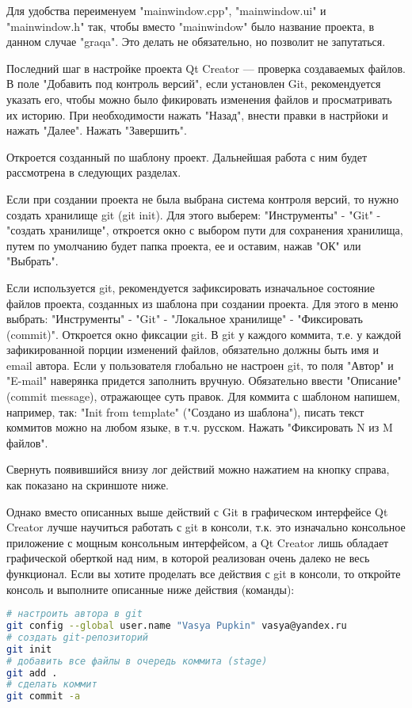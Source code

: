 Для удобства переименуем "mainwindow.cpp", "mainwindow.ui" и "mainwindow.h" так, чтобы вместо "mainwindow" было название проекта, в данном случае "graqa". Это делать не обязательно, но позволит не запутаться.

Последний шаг в настройке проекта Qt Creator — проверка создаваемых файлов. В поле "Добавить под контроль версий", если установлен Git, рекомендуется указать его, чтобы можно было фикировать изменения файлов и просматривать их историю. При необходимости нажать "Назад", внести правки в настрйоки и нажать "Далее". Нажать "Завершить".

Откроется созданный по шаблону проект. Дальнейшая работа с ним будет рассмотрена в следующих разделах.

Если при создании проекта не была выбрана система контроля версий, то нужно создать хранилище git (git init). Для этого выберем: "Инструменты" - "Git" - "создать хранилище", откроется окно с выбором пути для сохранения хранилища, путем по умолчанию будет папка проекта, ее и оставим, нажав "ОК" или "Выбрать".

Если используется git, рекомендуется зафиксировать изначальное состояние файлов проекта, созданных из шаблона при создании проекта. Для этого в меню выбрать: "Инструменты" - "Git" - "Локальное хранилище" - "Фиксировать (commit)". Откроется окно фиксации git. В git у каждого коммита, т.е. у каждой зафикированной порции изменений файлов, обязательно должны быть имя и email автора. Если у пользователя глобально не настроен git, то поля "Автор" и "E-mail" наверянка придется заполнить вручную. Обязательно ввести "Описание" (commit message), отражающее суть правок. Для коммита с шаблоном напишем, например, так: "Init from template" ("Создано из шаблона"), писать текст коммитов можно на любом языке, в т.ч. русском. Нажать "Фиксировать N из M файлов".

Свернуть появившийся внизу лог действий можно нажатием на кнопку справа, как показано на скриншоте ниже.

Однако вместо описанных выше действий с Git в графическом интерфейсе Qt Creator лучше научиться работать с git в консоли, т.к. это изначально консольное приложение с мощным консольным интерфейсом, а Qt Creator лишь обладает графической оберткой над ним, в которой реализован очень далеко не весь функционал. Если вы хотите проделать все действия с git в консоли, то откройте консоль и выполните описанные ниже действия (команды):

\begin{lstlisting}[language=bash]
# настроить автора в git
git config --global user.name "Vasya Pupkin" vasya@yandex.ru
# создать git-репозиторий
git init
# добавить все файлы в очередь коммита (stage)
git add .
# сделать коммит
git commit -a
\end{lstlisting}

\clearpage

